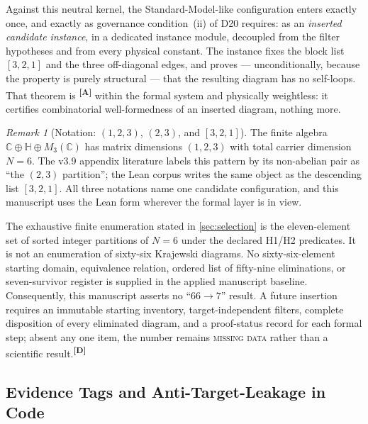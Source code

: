 \documentclass[12pt,a4paper,twoside]{article}
\theoremstyle{plain}
\theoremstyle{definition}
\theoremstyle{remark}
\newtheorem{remark}[theorem]{Remark}
\newcommand{\catmark}[1]{\textsuperscript{\textsf{\textbf{[#1]}}}}
\begin{document}
Against this neutral kernel, the Standard-Model-like configuration enters
exactly once, and exactly as governance condition~(ii) of D20 requires: as
an \emph{inserted candidate instance}, in a dedicated instance module,
decoupled from the filter hypotheses and from every physical constant. The
instance fixes the block list $[3,2,1]$ and the three off-diagonal edges,
and proves --- unconditionally, because the property is purely structural
--- that the resulting diagram has no self-loops. That theorem is
\catmark{A} within the formal system and physically weightless: it
certifies combinatorial well-formedness of an inserted diagram, nothing
more.

\begin{remark}[{Notation: $(1,2,3)$, $(2,3)$, and $[3,2,1]$}]
\label{rem:partition-notation}
The finite algebra $\mathbb C \oplus \mathbb H \oplus M_3(\mathbb C)$ has
matrix dimensions $(1,2,3)$ with total carrier dimension $N = 6$. The
v3.9 appendix literature labels this pattern by its non-abelian pair as
``the $(2,3)$ partition''; the Lean corpus writes the same object as the
descending list $[3,2,1]$. All three notations name one candidate
configuration, and this manuscript uses the Lean form wherever the formal layer
is in view.
\end{remark}

\begin{governancebox}
The exhaustive finite enumeration stated in \cref{sec:selection} is the
eleven-element set of sorted integer partitions of $N=6$ under the
declared H1/H2 predicates. It is not an enumeration of sixty-six
Krajewski diagrams. No sixty-six-element starting domain, equivalence
relation, ordered list of fifty-nine eliminations, or seven-survivor
register is supplied in the applied manuscript baseline. Consequently,
this manuscript asserts no ``$66\to7$'' result. A future insertion requires an
immutable starting inventory, target-independent filters, complete
disposition of every eliminated diagram, and a proof-status record for
each formal step; absent any one item, the number remains
\textsc{missing data} rather than a scientific result.\catmark{D}
\end{governancebox}

\subsection{Evidence Tags and Anti-Target-Leakage in Code}
\label{subsec:code-evidence}
\end{document}
